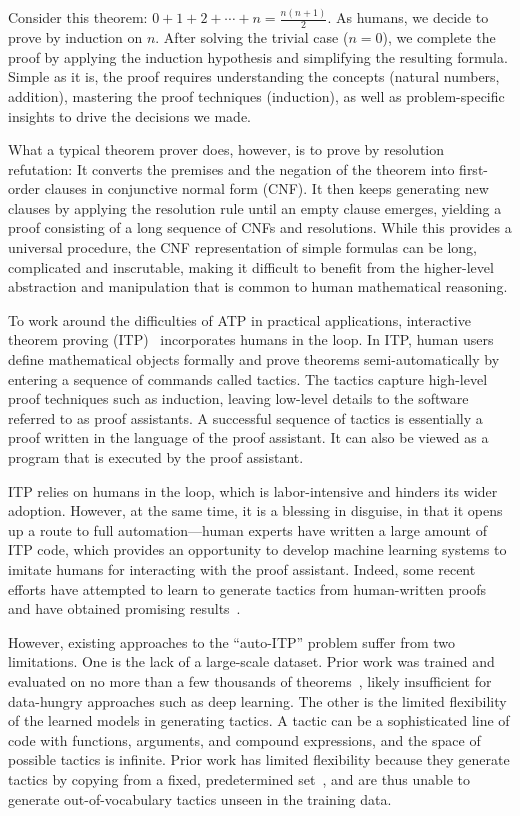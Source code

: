 \documentclass{article}
\begin{document}
Consider this theorem: $0 + 1 + 2 + \cdots + n = \frac{n(n+1)}{2}$. 
As humans, we decide to prove by induction on $n$.
After solving the trivial case ($n = 0$), we complete the proof by applying the induction hypothesis and simplifying the resulting formula.
Simple as it is, the proof requires understanding the concepts (natural numbers, addition), mastering the proof techniques (induction), as well as problem-specific insights to drive the decisions we made.

What a typical theorem prover does, however, is to prove by resolution refutation:
It converts the premises and the negation of the theorem into first-order clauses in conjunctive normal form (CNF).
It then keeps generating new clauses by applying the resolution rule until an empty clause emerges,
yielding a proof consisting of a long sequence of CNFs and resolutions. While this provides a universal procedure, the CNF representation of simple formulas can be long, complicated and inscrutable, making it difficult to benefit from the higher-level abstraction and manipulation that is common to human mathematical reasoning. 

To work around the difficulties of ATP in practical applications, interactive theorem proving (ITP)~\citep{harrison2014history} incorporates humans in the loop.
In ITP, human users define mathematical objects formally and prove theorems semi-automatically by entering a sequence of commands called tactics.
The tactics capture high-level proof techniques such as induction, 
leaving low-level details to the software referred to as proof assistants. A successful sequence of tactics is essentially a proof written in the language of the proof assistant. It can also be viewed as a program that is executed by the proof assistant. 

ITP relies on humans in the loop, which is labor-intensive and hinders its wider adoption. However, at the same time, it is a blessing in disguise, in that it opens up a route to full automation---human experts have written a large amount of ITP code, which provides an opportunity to develop machine learning systems to imitate humans for interacting with the proof assistant. Indeed, some recent efforts have attempted to learn to generate tactics from human-written proofs and have obtained promising results~\cite{gransden2015sepia,gauthier2018learning,bansal2019holist}. 

However, existing approaches to the ``auto-ITP'' problem suffer from two limitations. One is the lack of a large-scale dataset. Prior work was trained and evaluated on no more than a few thousands of theorems~\cite{gransden2015sepia,gauthier2018learning,huang2018gamepad}, likely insufficient for data-hungry approaches such as deep learning. The other is the limited flexibility of the learned models in generating tactics. A tactic can be a sophisticated line of code with functions, arguments, and compound expressions, and the space of possible tactics is infinite. Prior work has limited flexibility because they generate tactics by copying from a fixed, predetermined set~\cite{gransden2015sepia,gauthier2018learning,huang2018gamepad,bansal2019holist}, and are thus unable to generate out-of-vocabulary tactics unseen in the training data. 
\end{document}
